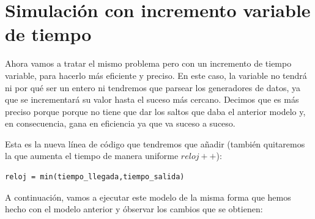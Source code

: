 \documentclass[11pt,a4paper]{report}
\begin{document}
\section{Simulación con incremento variable de tiempo}

Ahora vamos a tratar el mismo problema pero con un incremento de tiempo variable, para hacerlo más eficiente y preciso. En este caso, la variable no tendrá ni por
qué ser un entero ni tendremos que parsear los generadores de datos, ya que se incrementará su valor hasta el suceso más cercano. Decimos que es más preciso porque
porque no tiene que dar los saltos que daba el anterior modelo y, en consecuencia, gana en eficiencia ya que va suceso a suceso.

Esta es la nueva línea de código que tendremos que añadir (también quitaremos la que aumenta el tiempo de manera uniforme $reloj++$):
\begin{lstlisting}
reloj = min(tiempo_llegada,tiempo_salida)
\end{lstlisting}

A continuación, vamos a ejecutar este modelo de la misma forma que hemos hecho con el modelo anterior y óbservar los cambios que se obtienen:

\begin{table}[H]
\end{table}
\end{document}
